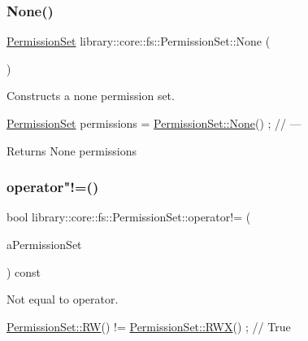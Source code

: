\subsubsection{\texorpdfstring{None()}{None()}}
{\footnotesize\ttfamily \hyperlink{classlibrary_1_1core_1_1fs_1_1_permission_set}{Permission\+Set} library\+::core\+::fs\+::\+Permission\+Set\+::\+None (\begin{DoxyParamCaption}{ }\end{DoxyParamCaption})\hspace{0.3cm}{\ttfamily [static]}}



Constructs a none permission set. 


\begin{DoxyCode}
\hyperlink{classlibrary_1_1core_1_1fs_1_1_permission_set_a8a6eb39cc2a8bca92a657d065d3e36ba}{PermissionSet} permissions = \hyperlink{classlibrary_1_1core_1_1fs_1_1_permission_set_a23fef193e66e47d7319ce3a707bb9cfe}{PermissionSet::None}() ; \textcolor{comment}{// ---}
\end{DoxyCode}


\begin{DoxyReturn}{Returns}
None permissions 
\end{DoxyReturn}
\mbox{\label{classlibrary_1_1core_1_1fs_1_1_permission_set_a7549184997b592bb790ccad3e9084a19}} 
\subsubsection{\texorpdfstring{operator"!=()}{operator!=()}}
{\footnotesize\ttfamily bool library\+::core\+::fs\+::\+Permission\+Set\+::operator!= (\begin{DoxyParamCaption}\item[{const \hyperlink{classlibrary_1_1core_1_1fs_1_1_permission_set}{Permission\+Set} \&}]{a\+Permission\+Set }\end{DoxyParamCaption}) const}



Not equal to operator. 


\begin{DoxyCode}
\hyperlink{classlibrary_1_1core_1_1fs_1_1_permission_set_aed46e87c4c521dd37d7f276d8ca87955}{PermissionSet::RW}() != \hyperlink{classlibrary_1_1core_1_1fs_1_1_permission_set_aa193bcbecb0c6ebbb488e99052cbba88}{PermissionSet::RWX}() ; \textcolor{comment}{// True}
\end{DoxyCode}



